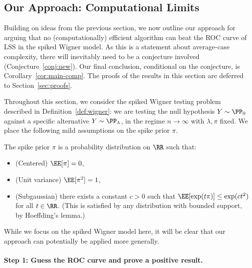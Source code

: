 \documentclass[11pt]{article}
\begin{document}
\subsection{Our Approach: Computational Limits}
\label{sec:our-approach-comp}

Building on ideas from the previous section, we now outline our approach for arguing that no (computationally) efficient algorithm can beat the ROC curve of LSS in the spiked Wigner model. As this is a statement about average-case complexity, there will inevitably need to be a conjecture involved (Conjecture~\ref{conj:new}). Our final conclusion, conditional on the conjecture, is Corollary~\ref{cor:main-comp}. The proofs of the results in this section are deferred to Section~\ref{sec:proofs}.

Throughout this section, we consider the spiked Wigner testing problem described in Definition~\ref{def:wigner}: we are testing the null hypothesis $Y \sim \PP_0$ against a specific alternative $Y \sim \PP_\lambda$, in the regime $n \to \infty$ with $\lambda, \pi$ fixed. We place the following mild assumptions on the spike prior $\pi$.

\begin{assumption}\label{assum:pi}
The spike prior $\pi$ is a probability distribution on $\RR$ such that:
\begin{itemize}
\item (Centered) $\EE[\pi] = 0$,
\item (Unit variance) $\EE[\pi^2] = 1$,
\item (Subgaussian) there exists a constant $c > 0$ such that $\EE[\exp(t\pi)] \le \exp(ct^2)$ for all $t \in \RR$. (This is satisfied by any distribution with bounded support, by Hoeffding's lemma.)
\end{itemize}
\end{assumption}

\noindent While we focus on the spiked Wigner model here, it will be clear that our approach can potentially be applied more generally.


\paragraph{Step 1: Guess the ROC curve and prove a positive result.}
\end{document}
